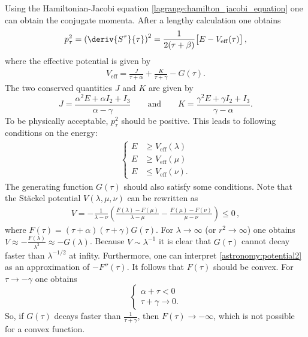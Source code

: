     Using the Hamiltonian-Jacobi equation \eqref{lagrange:hamilton_jacobi_equation} one can obtain the conjugate momenta. After a lengthy calculation one obtains
    \begin{gather}
        p_\tau^2 = \left(\deriv{S^\tau}{\tau}\right)^2 = \frac{1}{2(\tau+\beta)}\big[E - V_\mathrm{eff}(\tau)\big]\,,
    \end{gather}
    where the effective potential is given by
    \begin{gather}
        V_\text{eff} = \frac{J}{\tau+\alpha} + \frac{K}{\tau+\gamma} - G(\tau).
    \end{gather}
    The two conserved quantities $J$ and $K$ are given by \[J = \frac{\alpha^2E + \alpha I_2 + I_3}{\alpha - \gamma} \qquad\text{and}\qquad K = \frac{\gamma^2E + \gamma I_2 + I_3}{\gamma - \alpha}.\] To be physically acceptable, $p_\tau^2$ should be positive. This leads to following conditions on the energy:
    \begin{gather}
        \begin{cases}
            E&\geq V_\mathrm{eff}(\lambda)\\
            E&\geq V_\mathrm{eff}(\mu)\\
            E&\leq V_\mathrm{eff}(\nu).
        \end{cases}
    \end{gather}
    The generating function $G(\tau)$ should also satisfy some conditions. Note that the St\"ackel potential $V(\lambda,\mu,\nu)$ can be rewritten as
    \begin{gather}
        \label{astronomy:potential2}
        V = -\frac{1}{\lambda - \nu}\left(\frac{F(\lambda) - F(\mu)}{\lambda - \mu} - \frac{F(\mu) - F(\nu)}{\mu - \nu}\right) \leq 0\,,
    \end{gather}
    where $F(\tau) = (\tau + \alpha)(\tau + \gamma)G(\tau)$. For $\lambda\longrightarrow\infty$ (or $r^2\longrightarrow\infty$) one obtains $V\approx-\frac{F(\lambda)}{\lambda^2}\approx-G(\lambda)$. Because $V\sim \lambda^{-1}$ it is clear that $G(\tau)$ cannot decay faster than $\lambda^{-1/2}$ at infity. Furthermore, one can interpret \eqref{astronomy:potential2} as an approximation of $-F''(\tau)$. It follows that $F(\tau)$ should be convex. For $\tau\longrightarrow-\gamma$ one obtains \[\begin{cases}\alpha + \tau < 0\\\tau + \gamma\longrightarrow 0.\end{cases}\] So, if $G(\tau)$ decays faster than $\frac{1}{\tau + \gamma}$, then $F(\tau)\longrightarrow-\infty$, which is not possible for a convex function.

